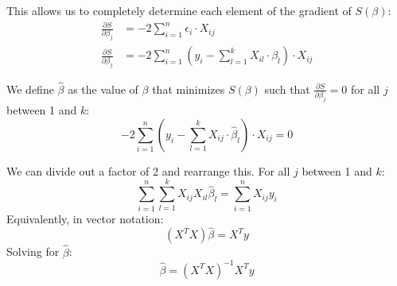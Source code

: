 This allows us to completely determine each element of the 
gradient of $S(\beta)$:
\begin{align}
  \frac{\partial S}{\partial \beta_j} &= -2 \sum_{i = 1}^{n} \epsilon_{i} \cdot X_{ij} \\
  \frac{\partial S}{\partial \beta_j} &= -2 \sum_{i = 1}^{n} \left(y_i - \sum_{l = 1}^{k}X_{il}\cdot \beta_{l}\right) \cdot X_{ij}
\end{align}

We define $\hat{\beta}$ as the value of $\beta$ that minimizes $S(\beta)$ such
that $\frac{\partial S}{\partial \beta_j} = 0$ for all $j$ between 1 and $k$:
\begin{equation}
  -2 \sum_{i = 1}^{n} \left(y_i - \sum_{l = 1}^{k}X_{ij}\cdot \hat{\beta}_{l}\right) \cdot X_{ij} = 0
\end{equation}

We can divide out a factor of 2 and rearrange this. For all $j$ between 1 and $k$:
\begin{equation}
  \sum_{i = 1}^{n} \sum_{l = 1}^{k} X_{ij}X_{il}\hat{\beta}_l = \sum_{i = 1}^{n}X_{ij} y_{i}
\end{equation}
Equivalently, in vector notation:
\begin{equation}
  \left(X^{T}X\right)\hat{\beta} = X^{T}y
\end{equation}
Solving for $\hat{\beta}$:
\begin{equation}
  \hat{\beta} = \left(X^{T}X\right)^{-1} X^{T}y
\end{equation}

